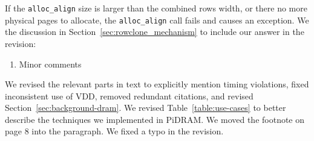 If the \texttt{alloc\_align} size is larger than the combined rows width, or there  no more physical pages to allocate, the \texttt{alloc\_align} call fails and causes an exception. We  the discussion in Section~\ref{sec:rowclone_mechanism} to include our answer in the revision:

\vspace{5pt}
\yyboxbegin 
{}
\yyboxend 


\bigbreak
\begin{tcolorbox}
    \begin{enumerate}[label=R5/\arabic*]
        \addtocounter{enumi}{5}
        \item \label{q:r5q6} Minor comments
    \end{enumerate}
\end{tcolorbox} 

We revised the relevant parts in text to explicitly mention timing violations, fixed inconsistent use of VDD, removed redundant citations, and revised Section~\ref{sec:background-dram}. We revised Table~\ref{table:use-cases} to better describe the techniques we implemented in PiDRAM. We moved the footnote on page 8 into the paragraph. We fixed a typo in the revision.